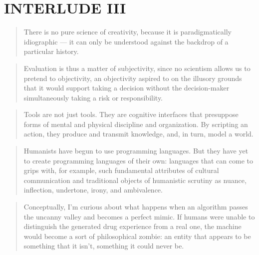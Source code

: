 
\pagestyle{empty}

\chapter*{INTERLUDE III}
\label{interlude3}



\begin{quotation}
  There is no pure science of creativity, because it is paradigmatically idiographic --- it can only be understood against the backdrop of a particular history.
\end{quotation}

\begin{quotation}
  Evaluation is thus a matter of subjectivity, since no scientism allows us to pretend to objectivity, an objectivity aspired to on the illusory grounds that it would support taking a decision without the decision-maker simultaneously taking a risk or responsibility. 
\end{quotation}

\begin{quotation}
  Tools are not just tools. They are cognitive interfaces that presuppose forms of mental and physical discipline and organization. By scripting an action, they produce and transmit knowledge, and, in turn, model a world. 
\end{quotation}

\begin{quotation}
  Humanists have begun to use programming languages. But they have yet to create programming languages of their own: languages that can come to grips with, for example, such fundamental attributes of cultural communication and traditional objects of humanistic scrutiny as nuance, inflection, undertone, irony, and ambivalence. 
\end{quotation}

\begin{quotation}
  Conceptually, I'm curious about what happens when an algorithm passes the uncanny valley and becomes a perfect mimic. If humans were unable to distinguish the generated drug experience from a real one, the machine would become a sort of philosophical zombie: an entity that appears to be something that it isn't, something it could never be. 
\end{quotation}


\pagestyle{fania}


\clearpage